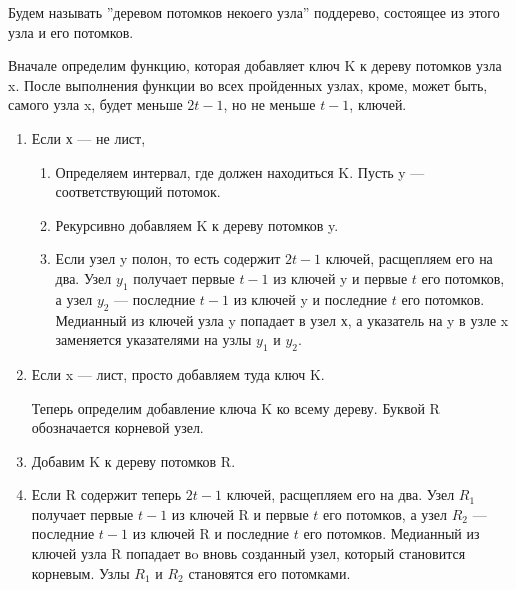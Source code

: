 \documentclass[discrete.tex]{subfiles}
\begin{document}
  \begin{alg}
    Будем называть ''деревом потомков некоего узла'' поддерево, состоящее из этого узла и его потомков.

    Вначале определим функцию, которая добавляет ключ K к дереву потомков узла x. После выполнения функции во всех пройденных узлах, кроме, может быть, самого узла x, будет меньше $2t-1$, но не меньше $t-1$, ключей.
    \begin{enumerate}
      \item Если х — не лист,
      \begin{enumerate}
        \item Определяем интервал, где должен находиться K. Пусть y — соответствующий потомок.
        \item Рекурсивно добавляем K к дереву потомков y.
        \item Если узел y полон, то есть содержит $2t-1$ ключей, расщепляем его на два. Узел $y_1$ получает первые $t-1$ из ключей y и первые $t$ его потомков, а узел $y_2$ — последние $t-1$ из ключей y и последние $t$ его потомков. Медианный из ключей узла y попадает в узел х, а указатель на y в узле x заменяется указателями на узлы $y_1$ и $y_2$.
      \end{enumerate}
      \item Если x — лист, просто добавляем туда ключ K.

      Теперь определим добавление ключа K ко всему дереву. Буквой R обозначается корневой узел.
      \item Добавим K к дереву потомков R.
      \item Если R содержит теперь $2t-1$ ключей, расщепляем его на два. Узел $R_1$ получает первые $t-1$ из ключей R и первые $t$ его потомков, а узел $R_2$ — последние $t-1$ из ключей R и последние $t$ его потомков. Медианный из ключей узла R попадает вo вновь созданный узел, который становится корневым. Узлы $R_1$ и $R_2$ становятся его потомками.
    \end{enumerate}
  \end{alg}
\end{document}
